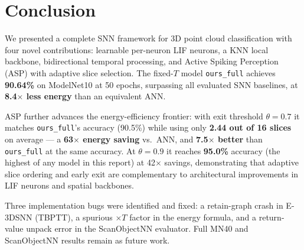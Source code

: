 \documentclass[11pt,a4paper]{article}
\begin{document}
\section{Conclusion}

We presented a complete SNN framework for 3D point cloud classification with
four novel contributions: learnable per-neuron LIF neurons, a KNN local backbone,
bidirectional temporal processing, and Active Spiking Perception (ASP) with
adaptive slice selection. The fixed-$T$ model \texttt{ours\_full} achieves
\textbf{90.64\%} on ModelNet10 at 50 epochs, surpassing all evaluated SNN
baselines, at \textbf{8.4$\times$ less energy} than an equivalent ANN.

ASP further advances the energy-efficiency frontier: with exit threshold
$\theta = 0.7$ it matches \texttt{ours\_full}'s accuracy (90.5\%) while using
only \textbf{2.44 out of 16 slices} on average --- a \textbf{63$\times$ energy
saving} vs.\ ANN, and \textbf{7.5$\times$ better} than \texttt{ours\_full} at
the same accuracy. At $\theta = 0.9$ it reaches \textbf{95.0\%} accuracy (the
highest of any model in this report) at 42$\times$ savings, demonstrating that
adaptive slice ordering and early exit are complementary to architectural
improvements in LIF neurons and spatial backbones.

Three implementation bugs were identified and fixed: a retain-graph crash in
E-3DSNN (TBPTT), a spurious $\times T$ factor in the energy formula, and a
return-value unpack error in the ScanObjectNN evaluator. Full MN40 and
ScanObjectNN results remain as future work.
\end{document}
